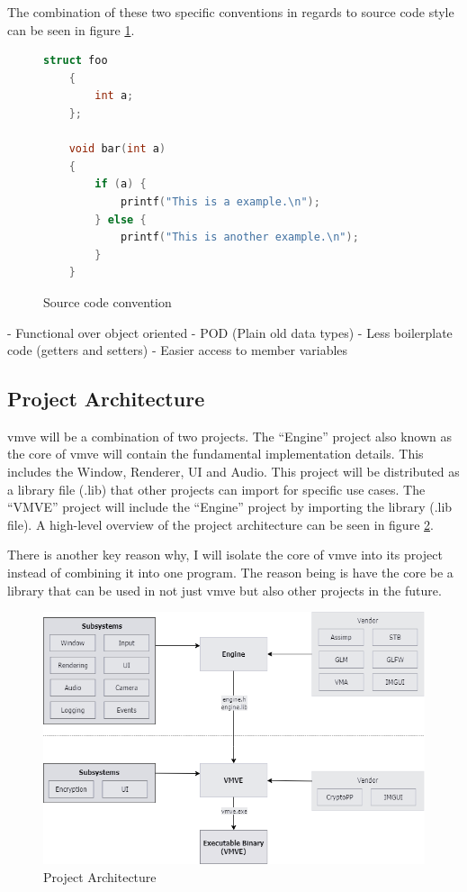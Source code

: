 \documentclass[11pt]{article}
\begin{document}
The combination of these two specific conventions in regards to source code
style can be seen in figure \ref{fig:convention}.

\begin{figure}[ht]
  \centering
  \begin{lstlisting}[language=C++]
    struct foo
    {
        int a;
    };

    void bar(int a)
    {
        if (a) {
            printf("This is a example.\n");
        } else {
            printf("This is another example.\n");
        }
    }
  \end{lstlisting}
  \caption{Source code convention}
  \label{fig:convention}
  \end{figure}


  - Functional over object oriented
  -   POD (Plain old data types)
  -   Less boilerplate code (getters and setters)
  -   Easier access to member variables

\subsection{Project Architecture}

\gls{vmve} will be a combination of two projects. The ``Engine'' project also
known as the core of \gls{vmve} will contain the fundamental implementation
details. This includes the Window, Renderer, UI and Audio. This project will be
distributed as a library file (.lib) that other projects can import for specific
use cases. The ``VMVE'' project will include the ``Engine'' project by importing
the library (.lib file). A high-level overview of the project architecture can
be seen in figure \ref{fig:projarch}.

There is another key reason why, I will isolate the core of \gls{vmve} into its
project instead of combining it into one program. The reason being is have the
core be a library that can be used in not just \gls{vmve} but also other
projects in the future.

\begin{figure}[h!]
  \centering
  \includegraphics[width=\textwidth]{images/project_architecture.png}
  \caption{Project Architecture}
  \label{fig:projarch}
\end{figure}
\end{document}
